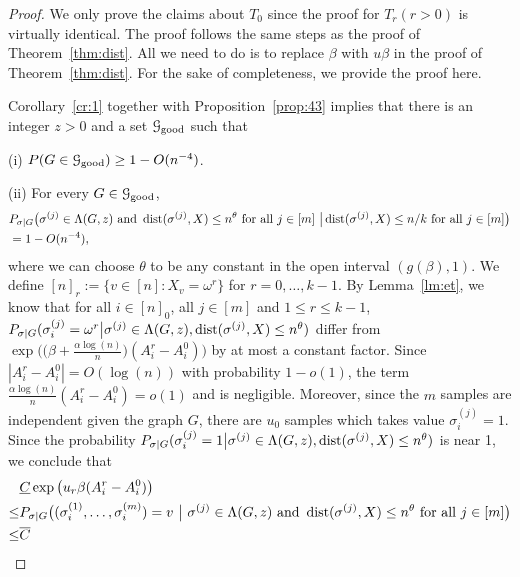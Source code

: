 \documentclass{article}
\begin{document}
\begin{proof}

	We only prove the claims about $T_0$ since the proof for $T_r (r>0)$ is virtually identical.
	The proof follows the same steps as the proof of Theorem~\ref{thm:dist}. All we need to do is to replace $\beta$ with $u\beta$ in the proof of Theorem~\ref{thm:dist}. For the sake of completeness, we provide the proof here.
	
	
	Corollary~\ref{cr:1} together with Proposition~\ref{prop:43} implies that there is an integer $z>0$ and a set $\mathcal{G}_{\operatorname{good}}$ such that
	
	\noindent (i)
	$P(G\in\mathcal{G}_{\operatorname{good}}) \ge 1- O(n^{-4})$.
	
	\noindent (ii) For every $G\in\mathcal{G}_{\operatorname{good}}$, 
	\begin{equation}  \label{eq:ljrc}
	\begin{aligned}
	& P_{\sigma|G} \big( \sigma^{(j)}\in  \Lambda(G, z)
	\text{~and~} \operatorname{dist}(\sigma^{(j)}, X) \le n^\theta
	\text{~for all~} j\in[m] ~\big| \operatorname{dist}(\sigma^{(j)}, X) \le n/k
	\text{~for all~} j\in[m]  \big) \\
	& =1- O(n^{-4}) ,
	\end{aligned}
	\end{equation}
	where we can choose $\theta$ to be any constant in the open interval $(g(\beta), 1)$.
	We define $[n]_r:=\{v\in[n]:X_v= \omega^r\}$ for $r=0, \dots, k-1$.
	By Lemma~\ref{lm:et}, we know that for all $i\in[n]_0$, all $j\in[m]$ and $1\leq r \leq k-1$,
	$P_{\sigma|G}(\sigma_i^{(j)} = \omega^r \big| \sigma^{(j)}\in \Lambda(G,z) ,\operatorname{dist}(\sigma^{(j)}, X) \le n^{\theta} )$ differ from
	$\exp\Big(\big(\beta+\frac{\alpha\log(n)}{n} \big) (A^r_i-A^0_i) \Big)$
	by at most a constant factor. Since $|A^r_i-A^0_i|=O(\log(n))$ with probability $1-o(1)$, the term $\frac{\alpha\log(n)}{n}(A^r_i-A^0_i)=o(1)$ and is negligible. Moreover, since the $m$ samples are independent given the graph $G$, there are $u_0$ samples which takes value $\sigma_i^{(j)} = 1$. Since the probability
	$P_{\sigma|G}(\sigma_i^{(j)} = 1 \big| \sigma^{(j)}\in \Lambda(G,z) ,\operatorname{dist}(\sigma^{(j)}, X) \le n^{\theta} )$ is near 1, we conclude that
	\begin{align*}
	& \underline{C}
	\exp\big(u_r\beta (A^r_i-A^0_i) \big) \\
	\le
	& P_{\sigma|G} \big( (\sigma_i^{(1)},\dots,\sigma_i^{(m)})=v ~\big|~ \sigma^{(j)}\in  \Lambda(G, z)
	\text{~and~} \dist(\sigma^{(j)}, X) \le n^\theta
	\text{~for all~} j\in[m] \big) \\
	\le & \overline{C}

\end{align*}
\end{proof}
\end{document}
